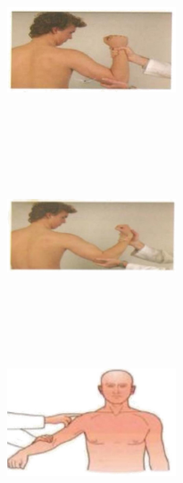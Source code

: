 \documentclass[a4paper,12pt,openany,oneside]{book}
\begin{document}
{\begin{figure}[H]
\begin{subfigure}[t]{.25\textwidth}
		\end{subfigure}
		\hspace{\fill}
		\begin{subfigure}[t]{.25\textwidth}
			\includegraphics[width=5cm,height=5cm]{./clinicalPhysioPic/motorSystem/flexorArm.jpg}
		\end{subfigure}
		\hspace{\fill}
		\begin{subfigure}[t]{.25\textwidth}
			\includegraphics[width=5cm,height=5cm]{./clinicalPhysioPic/motorSystem/extensorArm.jpg}
		\end{subfigure}
		\hspace{\fill}
		\begin{subfigure}[t]{.25\textwidth}
			\includegraphics[width=5cm,height=5cm]{./clinicalPhysioPic/motorSystem/deltoid.jpg}
		\end{subfigure}
		\hspace{\fill}

\end{figure}}
\end{document}
